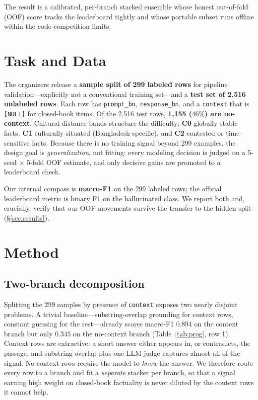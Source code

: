 \documentclass[11pt]{article}
\begin{document}
The result is a calibrated, per-branch stacked ensemble whose honest
out-of-fold (OOF) score tracks the leaderboard tightly and whose portable
subset runs offline within the code-competition limits.

\section{Task and Data}
The organizers release a \textbf{sample split of 299 labeled rows} for
pipeline validation---explicitly not a conventional training set---and a
\textbf{test set of 2{,}516 unlabeled rows}. Each row has \texttt{prompt\_bn},
\texttt{response\_bn}, and a \texttt{context} that is \texttt{[NULL]} for
closed-book items. Of the 2{,}516 test rows, \textbf{1{,}155 ($46\%$) are
no-context}. Cultural-distance bands structure the difficulty: \textbf{C0}
globally stable facts, \textbf{C1} culturally situated (Bangladesh-specific),
and \textbf{C2} contested or time-sensitive facts. Because there is no training
signal beyond 299 examples, the design goal is \emph{generalization}, not
fitting: every modeling decision is judged on a 5-seed $\times$ 5-fold OOF
estimate, and only decisive gains are promoted to a leaderboard check.

Our internal compass is \textbf{macro-F1} on the 299 labeled rows; the official
leaderboard metric is binary F1 on the hallucinated class. We report both and,
crucially, verify that our OOF movements survive the transfer to the hidden
split (\S\ref{sec:results}).

\section{Method}

\subsection{Two-branch decomposition}
\label{sec:branch}
Splitting the 299 samples by presence of \texttt{context} exposes two nearly
disjoint problems. A trivial baseline---substring-overlap grounding for context
rows, constant guessing for the rest---already scores macro-F1 $0.894$ on the
context branch but only $0.345$ on the no-context branch (Table~\ref{tab:prog},
row 1). Context rows are extractive: a short answer either appears in, or
contradicts, the passage, and substring overlap plus one LLM judge captures
almost all of the signal. No-context rows require the model to \emph{know} the
answer. We therefore route every row to a branch and fit a \emph{separate}
stacker per branch, so that a signal earning high weight on closed-book
factuality is never diluted by the context rows it cannot help.
\end{document}

